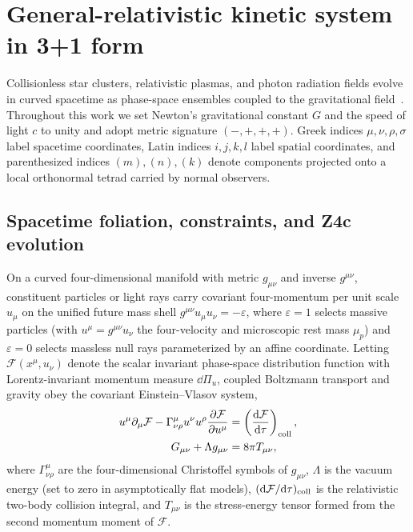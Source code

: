 \section{General-relativistic kinetic system in 3+1 form}\label{sec:system}

Collisionless star clusters, relativistic plasmas, and photon radiation fields evolve in curved spacetime as phase-space ensembles coupled to the gravitational field~\cite{Andreasson:2011ng,Sarbach:2013fya,Acuna-Cardenas:2021nkj}. Throughout this work we set Newton's gravitational constant $G$ and the speed of light $c$ to unity and adopt metric signature $(-,+,+,+)$. Greek indices $\mu,\nu,\rho,\sigma$ label spacetime coordinates, Latin indices $i,j,k,l$ label spatial coordinates, and parenthesized indices $(m),(n),(k)$ denote components projected onto a local orthonormal tetrad carried by normal observers.

\subsection{Spacetime foliation, constraints, and Z4c evolution}\label{sec:system_z4c}

On a curved four-dimensional manifold with metric $g_{\mu\nu}$ and inverse $g^{\mu\nu}$, constituent particles or light rays carry covariant four-momentum per unit scale $u_\mu$ on the unified future mass shell $g^{\mu\nu} u_\mu u_\nu = -\varepsilon$, where $\varepsilon = 1$ selects massive particles (with $u^\mu = g^{\mu\nu}u_\nu$ the four-velocity and microscopic rest mass $\mu_p$) and $\varepsilon = 0$ selects massless null rays parameterized by an affine coordinate. Letting $\mathcal{F}(x^\mu, u_\nu)$ denote the scalar invariant phase-space distribution function with Lorentz-invariant momentum measure $\dd\Pi_u$, coupled Boltzmann transport and gravity obey the covariant Einstein--Vlasov system,
\begin{align}\label{eq:einstein_vlasov}
u^\mu \partial_\mu \mathcal{F} - \Gamma^\mu_{\nu\rho} u^\nu u^\rho \frac{\partial \mathcal{F}}{\partial u^\mu} &= \left(\frac{\mathrm{d} \mathcal{F}}{\mathrm{d}\tau}\right)_{\rm coll}, \nonumber\\
G_{\mu\nu} + \Lambda g_{\mu\nu} &= 8\pi T_{\mu\nu},
\end{align}
where $\Gamma^\mu_{\nu\rho}$ are the four-dimensional Christoffel symbols of $g_{\mu\nu}$, $\Lambda$ is the vacuum energy (set to zero in asymptotically flat models), $(\mathrm{d} \mathcal{F}/\mathrm{d}\tau)_{\rm coll}$ is the relativistic two-body collision integral, and $T_{\mu\nu}$ is the stress-energy tensor formed from the second momentum moment of $\mathcal{F}$.

